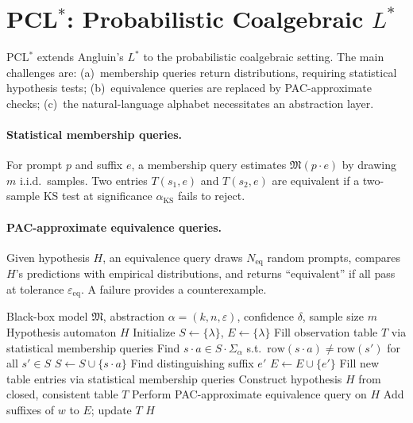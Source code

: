 \documentclass[11pt]{article}
\newcommand{\pclstar}{PCL$^*$}
\begin{document}
\appendix

\section{\pclstar{}: Probabilistic Coalgebraic $L^*$}\label{app:pclstar}

\pclstar{} extends Angluin's $L^*$ to the probabilistic coalgebraic
setting.  The main challenges are:
(a)~membership queries return distributions, requiring statistical
hypothesis tests;
(b)~equivalence queries are replaced by PAC-approximate checks;
(c)~the natural-language alphabet necessitates an abstraction layer.

\paragraph{Statistical membership queries.}
For prompt $p$ and suffix $e$, a membership query estimates
$\mathfrak{M}(p \cdot e)$ by drawing $m$ i.i.d.\ samples.  Two
entries $T(s_1, e)$ and $T(s_2, e)$ are equivalent if a two-sample
KS test at significance $\alpha_{\mathrm{KS}}$ fails to reject.

\paragraph{PAC-approximate equivalence queries.}
Given hypothesis $H$, an equivalence query draws $N_{\mathrm{eq}}$
random prompts, compares $H$'s predictions with empirical distributions,
and returns ``equivalent'' if all pass at tolerance
$\varepsilon_{\mathrm{eq}}$.  A failure provides a counterexample.

\begin{algorithm}[t]
\caption{\pclstar{}: Probabilistic Coalgebraic $L^*$}\label{alg:pclstar}
\begin{algorithmic}[1]
\Require Black-box model $\mathfrak{M}$, abstraction $\alpha=(k,n,\varepsilon)$,
         confidence $\delta$, sample size $m$
\Ensure Hypothesis automaton $H$
\State Initialize $S \gets \{\lambda\}$, $E \gets \{\lambda\}$
\State Fill observation table $T$ via statistical membership queries
\Repeat
      \State Find $s \cdot a \in S \cdot \Sigma_\alpha$ s.t.\
             $\mathrm{row}(s \cdot a) \neq \mathrm{row}(s')$ for all
             $s' \in S$
      \State $S \gets S \cup \{s \cdot a\}$
    \EndIf
      \State Find distinguishing suffix $e'$
      \State $E \gets E \cup \{e'\}$
    \EndIf
    \State Fill new table entries via statistical membership queries
  \EndWhile
  \State Construct hypothesis $H$ from closed, consistent table $T$
  \State Perform PAC-approximate equivalence query on $H$
    \State Add suffixes of $w$ to $E$; update $T$
  \EndIf
{}
\State \Return $H$
\end{algorithmic}
\end{algorithm}
\end{document}

